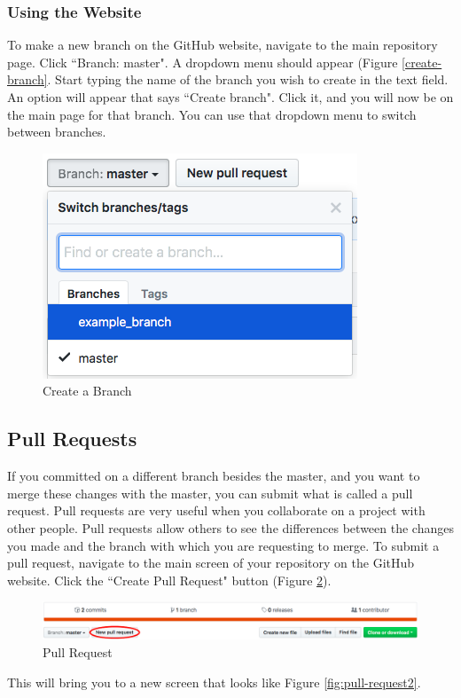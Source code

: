 \documentclass[11pt,a4paper]{article}
\begin{document}
\subsubsection{Using the Website}
To make a new branch on the GitHub website, navigate to the main repository page.
Click ``Branch: master".
A dropdown menu should appear (Figure \ref{create-branch}.
Start typing the name of the branch you wish to create in the text field.
An option will appear that says ``Create branch".
Click it, and you will now be on the main page for that branch.
You can use that dropdown menu to switch between branches.

\begin{figure}[h!]
\centering
\includegraphics[width=.4\textwidth]{figures/create_branch_website.png}
\caption{Create a Branch}
\label{fig:create-branch}
\end{figure}


\subsection{Pull Requests}
If you committed on a different branch besides the master, and you want to merge these changes with the master, you can submit what is called a pull request.
Pull requests are very useful when you collaborate on a project with other people.
Pull requests allow others to see the differences between the changes you made and the branch with which you are requesting to merge.
To submit a pull request, navigate to the main screen of your repository on the GitHub website.
Click the ``Create Pull Request" button (Figure \ref{fig:pull-request}).

\begin{figure}[h!]
\centering
\includegraphics[width=.7\textwidth]{figures/pull_request.png}
\caption{Pull Request}
\label{fig:pull-request}
\end{figure}

This will bring you to a new screen that looks like Figure \ref{fig:pull-request2}.
\end{document}
